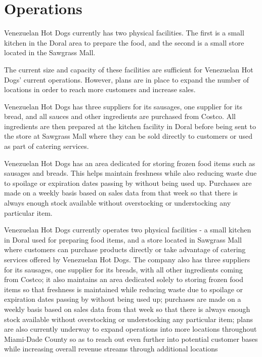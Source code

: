 

\section{Operations}\label{sec:operations}

 Venezuelan Hot Dogs currently has two physical facilities. The first is a small kitchen in the Doral area to prepare the food, and the second is a small store located in the Sawgrass Mall. 

The current size and capacity of these facilities are sufficient for Venezuelan Hot Dogs' current operations. However, plans are in place to expand the number of locations in order to reach more customers and increase sales. 

 Venezuelan Hot Dogs has three suppliers for its sausages, one supplier for its bread, and all sauces and other ingredients are purchased from Costco. All ingredients are then prepared at the kitchen facility in Doral before being sent to the store at Sawgrass Mall where they can be sold directly to customers or used as part of catering services. 

 Venezuelan Hot Dogs has an area dedicated for storing frozen food items such as sausages and breads. This helps maintain freshness while also reducing waste due to spoilage or expiration dates passing by without being used up. Purchases are made on a weekly basis based on sales data from that week so that there is always enough stock available without overstocking or understocking any particular item. 

  Venezuelan Hot Dogs currently operates two physical facilities - a small kitchen in Doral used for preparing food items, and a store located in Sawgrass Mall where customers can purchase products directly or take advantage of catering services offered by Venezuelan Hot Dogs. The company also has three suppliers for its sausages, one supplier for its breads, with all other ingredients coming from Costco; it also maintains an area dedicated solely to storing frozen food items so that freshness is maintained while reducing waste due to spoilage or expiration dates passing by without being used up; purchases are made on a weekly basis based on sales data from that week so that there is always enough stock available without overstocking or understocking any particular item; plans are also currently underway to expand operations into more locations throughout Miami-Dade County so as to reach out even further into potential customer bases while increasing overall revenue streams through additional locations
